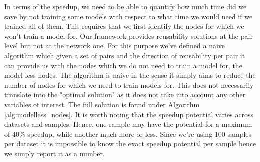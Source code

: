 \documentclass{mpaper}
\begin{document}
In terms of the speedup, we need to be able to quantify how much time did we save by not training some models with respect to what time we would need if we trained all of them. This requires that we first identify the nodes for which we won't train a model for. Our framework provides reusability solutions at the pair level but not at the network one. For this purpose we've defined a naive algorithm which given a set of pairs and the direction of reusability per pair it can provide us with the nodes which we do not need to train a model for, the model-less nodes. The algorithm is naive in the sense it simply aims to reduce the number of nodes for which we need to train models for. This does not necessarily translate into the "optimal solution" as it does not take into account any other variables of interest. The full solution is found under Algorithm \ref{alg:modelless_nodes}. It is worth noting that the speedup potential varies across datasets and samples. Hence, one sample may have the potential for a maximum of 40\% speedup, while another much more or less. Since we're using 100 samples per dataset it is impossible to know the exact speedup potential per sample hence we simply report it as a number. 
\end{document}
